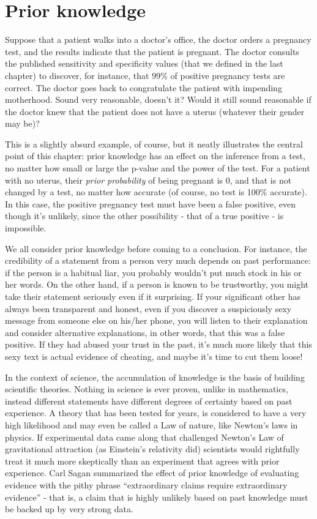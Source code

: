 \documentclass[
]{book}
\theoremstyle{definition}
\theoremstyle{definition}
\theoremstyle{definition}
\theoremstyle{remark}
\begin{document}
\hypertarget{prior-knowledge}{%
\section{Prior knowledge}\label{prior-knowledge}}

\label{sec:model7}

Suppose that a patient walks into a doctor's office, the doctor orders a pregnancy test, and the results indicate that the patient is pregnant. The doctor consults the published sensitivity and specificity values (that we defined in the last chapter) to discover, for instance, that 99\% of positive pregnancy tests are correct. The doctor goes back to congratulate the patient with impending motherhood. Sound very reasonable, doesn't it? Would it still sound reasonable if the doctor knew that the patient does not have a uterus (whatever their gender may be)?

This is a slightly absurd example, of course, but it neatly illustrates the central point of this chapter: prior knowledge has an effect on the inference from a test, no matter how small or large the p-value and the power of the test. For a patient with no uterus, their \emph{prior probability} of being pregnant is 0, and that is not changed by a test, no matter how accurate (of course, no test is 100\% accurate). In this case, the positive pregnancy test must have been a false positive, even though it's unlikely, since the other possibility - that of a true positive - is impossible.

We all consider prior knowledge before coming to a conclusion. For instance, the credibility of a statement from a person very much depends on past performance: if the person is a habitual liar, you probably wouldn't put much stock in his or her words. On the other hand, if a person is known to be trustworthy, you might take their statement seriously even if it surprising. If your significant other has always been transparent and honest, even if you discover a suspiciously sexy message from someone else on his/her phone, you will listen to their explanation and consider alternative explanations, in other words, that this was a false positive. If they had abused your trust in the past, it's much more likely that this sexy text is actual evidence of cheating, and maybe it's time to cut them loose!

In the context of science, the accumulation of knowledge is the basis of building scientific theories. Nothing in science is ever proven, unlike in mathematics, instead different statements have different degrees of certainty based on past experience. A theory that has been tested for years, is considered to have a very high likelihood and may even be called a Law of nature, like Newton's laws in physics. If experimental data came along that challenged Newton's Law of gravitational attraction (as Einstein's relativity did) scientists would rightfully treat it much more skeptically than an experiment that agrees with prior experience. Carl Sagan summarized the effect of prior knowledge of evaluating evidence with the pithy phrase ``extraordinary claims require extraordinary evidence'' - that is, a claim that is highly unlikely based on past knowledge must be backed up by very strong data.
\end{document}
